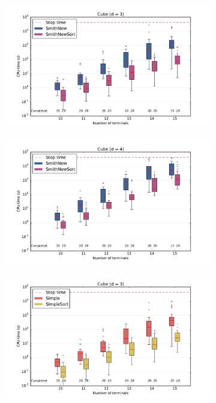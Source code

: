 \begin{figure}[htbp]
  \centering
  \begin{subfigure}[t]{0.5\textwidth}
    \includegraphics[width=\textwidth]{gfx/boxplots/plot_nvst_boxplot_d3_Cube_2}
  \end{subfigure}%
  \begin{subfigure}[t]{0.5\textwidth}
    \includegraphics[width=\textwidth]{gfx/boxplots/plot_nvst_boxplot_d4_Cube_2}
  \end{subfigure}
  \begin{subfigure}[t]{0.5\textwidth}
    \includegraphics[width=\textwidth]{gfx/boxplots/plot_nvst_boxplot_d3_Cube_3}

\end{subfigure}
\end{figure}
